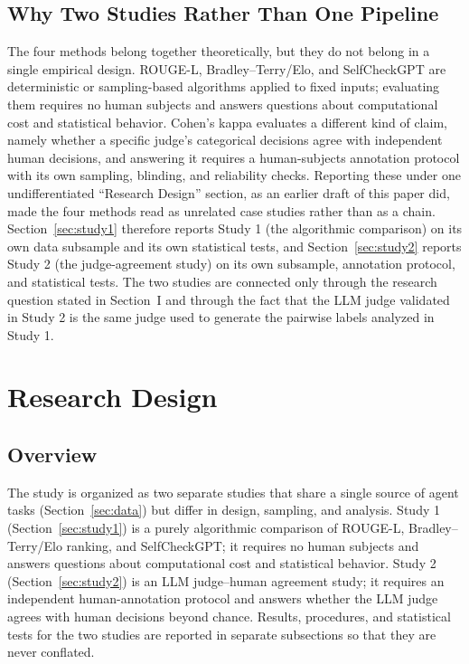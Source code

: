 \documentclass[conference]{IEEEtran}
\begin{document}
\subsection{Why Two Studies Rather Than One Pipeline}
The four methods belong together theoretically, but they do not belong in a single empirical design. ROUGE-L, Bradley--Terry/Elo, and SelfCheckGPT are deterministic or sampling-based algorithms applied to fixed inputs; evaluating them requires no human subjects and answers questions about computational cost and statistical behavior. Cohen's kappa evaluates a different kind of claim, namely whether a specific judge's categorical decisions agree with independent human decisions, and answering it requires a human-subjects annotation protocol with its own sampling, blinding, and reliability checks. Reporting these under one undifferentiated ``Research Design'' section, as an earlier draft of this paper did, made the four methods read as unrelated case studies rather than as a chain. Section~\ref{sec:study1} therefore reports Study 1 (the algorithmic comparison) on its own data subsample and its own statistical tests, and Section~\ref{sec:study2} reports Study 2 (the judge-agreement study) on its own subsample, annotation protocol, and statistical tests. The two studies are connected only through the research question stated in Section~I and through the fact that the LLM judge validated in Study 2 is the same judge used to generate the pairwise labels analyzed in Study 1.

\section{Research Design}
\subsection{Overview}
The study is organized as two separate studies that share a single source of agent tasks (Section~\ref{sec:data}) but differ in design, sampling, and analysis. Study 1 (Section~\ref{sec:study1}) is a purely algorithmic comparison of ROUGE-L, Bradley--Terry/Elo ranking, and SelfCheckGPT; it requires no human subjects and answers questions about computational cost and statistical behavior. Study 2 (Section~\ref{sec:study2}) is an LLM judge--human agreement study; it requires an independent human-annotation protocol and answers whether the LLM judge agrees with human decisions beyond chance. Results, procedures, and statistical tests for the two studies are reported in separate subsections so that they are never conflated.
\end{document}
